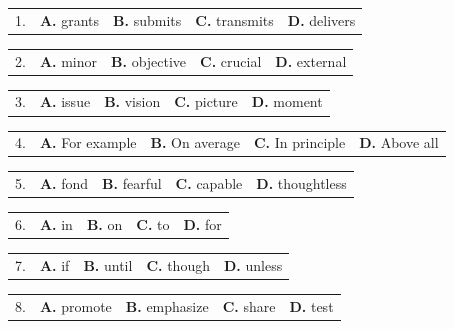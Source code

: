 \documentclass[UTF8,11pt]{ctexart}
\begin{document}
\noindent\begin{tabularx}{\linewidth}{@{}lXXXX@{}}1. & \textbf{A.} grants & \textbf{B.} submits & \textbf{C.} transmits & \textbf{D.} delivers\\\end{tabularx}\par

\noindent\begin{tabularx}{\linewidth}{@{}lXXXX@{}}2. & \textbf{A.} minor & \textbf{B.} objective & \textbf{C.} crucial & \textbf{D.} external\\\end{tabularx}\par

\noindent\begin{tabularx}{\linewidth}{@{}lXXXX@{}}3. & \textbf{A.} issue & \textbf{B.} vision & \textbf{C.} picture & \textbf{D.} moment\\\end{tabularx}\par

\noindent\begin{tabularx}{\linewidth}{@{}lXXXX@{}}4. & \textbf{A.} For example & \textbf{B.} On average & \textbf{C.} In principle & \textbf{D.} Above all\\\end{tabularx}\par

\noindent\begin{tabularx}{\linewidth}{@{}lXXXX@{}}5. & \textbf{A.} fond & \textbf{B.} fearful & \textbf{C.} capable & \textbf{D.} thoughtless\\\end{tabularx}\par

\noindent\begin{tabularx}{\linewidth}{@{}lXXXX@{}}6. & \textbf{A.} in & \textbf{B.} on & \textbf{C.} to & \textbf{D.} for\\\end{tabularx}\par

\noindent\begin{tabularx}{\linewidth}{@{}lXXXX@{}}7. & \textbf{A.} if & \textbf{B.} until & \textbf{C.} though & \textbf{D.} unless\\\end{tabularx}\par

\noindent\begin{tabularx}{\linewidth}{@{}lXXXX@{}}8. & \textbf{A.} promote & \textbf{B.} emphasize & \textbf{C.} share & \textbf{D.} test\\\end{tabularx}\par
\end{document}
